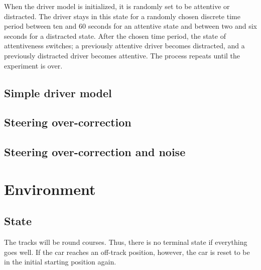 When the driver model is initialized, it is randomly set to be attentive or distracted. The driver stays in this state for a randomly chosen discrete time period between ten and 60 seconds for an attentive state and between two and six seconds for a distracted state. After the chosen time period, the state of attentiveness switches; a previously attentive driver becomes distracted, and a previously distracted driver becomes attentive. The process repeats until the experiment is over.

\subsection{Simple driver model}


\subsection{Steering over-correction}


\subsection{Steering over-correction and noise}

\section{Environment}

\subsection{State}


The tracks will be round courses. Thus, there is no terminal state if everything goes well. If the car reaches an off-track position, however, the car is reset to be in the initial starting position again.\\

